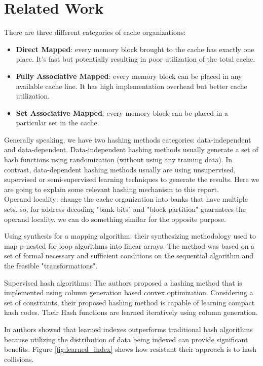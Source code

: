 \section{Related Work}
\label{related_work}
There are three different categories of cache organizations:
\begin{itemize}
	\item \textbf{Direct Mapped}: every memory block brought to the cache has exactly one place. It's fast but potentially resulting in poor utilization of the total cache.
	
	\item \textbf{Fully Associative Mapped}: every memory block can be placed in any available cache line. It has high implementation overhead but better cache utilization.
	
	\item \textbf{Set Associative Mapped}: every memory block can be placed in a particular set in the cache. 
\end{itemize}

Generally speaking, we have two hashing methods categories: data-independent and data-dependent. Data-independent hashing methods usually generate a set of hash functions using randomization (without using any training data). In contrast,  data-dependent hashing methods usually are using unsupervised, supervised or semi-supervised learning techniques to generate the results. Here we are going to explain some relevant hashing mechanism to this report. 
\\
Operand locality: change the cache organization into banks that
have multiple sets. so, for address decoding "bank bits" and "block partition" guarantees the operand locality. we can do something similar for the opposite purpose. \cite{compute-caches}

Using synthesis for a mapping algorithm: their synthesizing methodology used to map p-nested for loop algorithms into linear arrays. The method was based on a set of formal necessary and sufficient conditions on the sequential algorithm and the feasible "transformations". \cite{synthesis-map}

Supervised hash algorithms:
The authors proposed a hashing method that is implemented using column generation based convex optimization. Considering a set of constraints, their proposed hashing method is capable of learning compact hash codes. Their Hash functions are learned iteratively using column generation. \cite{learning-hash} 


In \cite{learning-index} authors showed that learned indexes outperforms traditional hash algorithms because utilizing the distribution of data being indexed can provide significant benefits. Figure \ref{fig:learned_index} shows how resistant their approach is to hash collisions. 

